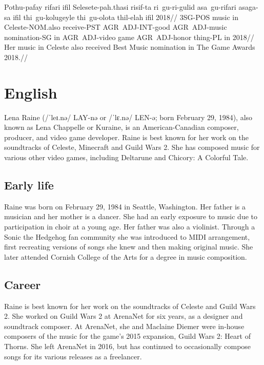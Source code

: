 \ex
\begingl
\gla  Pothu-pafay rifari ifil Selesete-pah.thasi risif-ta ri~gu-ri-gulid asa~gu-rifari asaga-sa ifil  thi~gu-kolugeyle thi~gu-olota thil-elah ifil 2018//
\glb  3SG-POS music in Celeste-NOM.also receive-PST AGR~ADJ-INT-good AGR~ADJ-music nomination-SG in  AGR~ADJ-video game AGR~ADJ-honor thing-PL in 2018//
\glft Her music in Celeste also received Best Music nomination in The Game Awards 2018.//
\endgl
\xe

\newpage

\section{English}
Lena Raine (/ˈleɪ.nə/ LAY-nə or /ˈlɛ.nə/ LEN-ə; born February 29, 1984), also known as Lena Chappelle or Kuraine, is an American-Canadian composer, producer, and video game developer.
Raine is best known for her work on the soundtracks of Celeste, Minecraft and Guild Wars 2.
She has composed music for various other video games, including Deltarune and Chicory: A Colorful Tale.

\subsection{Early life}

Raine was born on February 29, 1984 in Seattle, Washington.
Her father is a musician and her mother is a dancer.
She had an early exposure to music due to participation in choir at a young age.
Her father was also a violinist.
Through a Sonic the Hedgehog fan community she was introduced to MIDI arrangement, first recreating versions of songs she knew and then making original music.
She later attended Cornish College of the Arts for a degree in music composition.

\subsection{Career}

Raine is best known for her work on the soundtracks of Celeste and Guild Wars 2.
She worked on Guild Wars 2 at ArenaNet for six years, as a designer and soundtrack composer.
At ArenaNet, she and Maclaine Diemer were in-house composers of the music for the game's 2015 expansion, Guild Wars 2: Heart of Thorns.
She left ArenaNet in 2016, but has continued to occasionally compose songs for its various releases as a freelancer.

